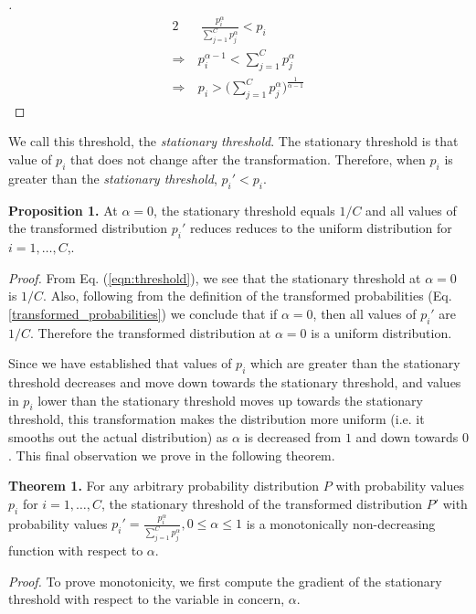 \documentclass[times,sort&compress]{elsarticle}
\begin{document}
\begin{proof}[\unskip\nopunct] \begin{alignat}{2} &\ \ \frac{p_i^{\alpha }}{\sum
_{j=1}^C p_j^{\alpha}} < p_i \\ \Rightarrow &\ p_i^{\alpha -1}<\sum _{j=1}^C p_j^{\alpha
} \\ \Rightarrow &\ p_i > \Big(\sum _{j=1}^C p_j^{\alpha}\Big)^{\frac{1}{\alpha-1}}
\end{alignat} \end{proof}

We call this threshold, the \textit{stationary threshold}. The stationary threshold is
that value of $p_i$ that does not change after the transformation. Therefore, when $p_i$
is greater than the \textit{stationary threshold}, $p_i' < p_i$.



\textbf{Proposition 1.} At $\alpha=0$, the stationary threshold equals $1/C$ and all
values of the transformed distribution $p_i'$ reduces reduces to the uniform
distribution for $i=1,\dots,C$,.

\textit{Proof.} From Eq. (\ref{eqn:threshold}), we see that the stationary threshold at
$\alpha=0$ is $1/C$. Also, following from the definition of the transformed
probabilities (Eq. \ref{transformed_probabilities}) we conclude that if $\alpha=0$, then
all values of $p_i'$ are $1/C$. Therefore the transformed distribution at $\alpha=0$ is
a uniform distribution.

Since we have established that values of $p_i$ which are greater than the stationary
threshold decreases and move down towards the stationary threshold, and values in $p_i$
lower than the stationary threshold moves up towards the stationary threshold, this
transformation makes the distribution more uniform (i.e. it smooths out the actual
distribution) as $\alpha$ is decreased from $1$ and down towards $0$. This final
observation we prove in the following theorem.



\textbf{Theorem 1.} For any arbitrary probability distribution $P$ with probability
values $p_i$ for $i=1,\dots,C$, the stationary threshold of the transformed distribution
$P'$ with probability values $p_i'=\frac{p_i^{\alpha}}{\sum _{j=1}^C p_j^\alpha}, 0 \leq
\alpha \leq 1$ is a monotonically non-decreasing function with respect to $\alpha$.

\textit{Proof.} To prove monotonicity, we first compute the gradient of the stationary
threshold with respect to the variable in concern, $\alpha$.
\end{document}
